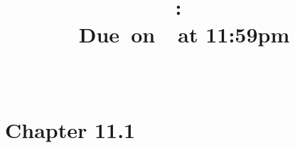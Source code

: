 \documentclass{article}
\title{
	\vspace{2in}
	\textmd{\textbf{\hmwkClass:\ \hmwkTitle}}\\
	\normalsize\vspace{0.1in}\small{Due\ on\ \hmwkDueDate\ at 11:59pm}\\
	\vspace{0.1in}\large{\textit{\hmwkClassInstructor\ \hmwkClassTime}}
	\vspace{3in}
}
\author{\hmwkAuthorName}
\date{}
\begin{document}
	\maketitle
	
	\pagebreak
	
	
	\section{Chapter 11.1}
	
	
\end{document}
